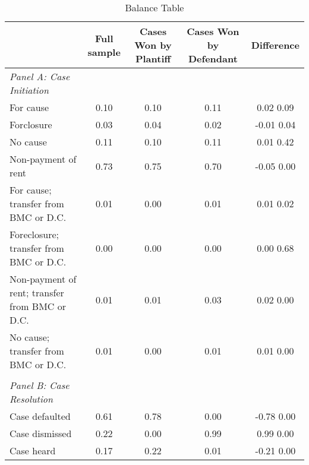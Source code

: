 \begin{table}[htbp]\centering
\def\sym#1{\ifmmode^{#1}\else\(^{#1}\)\fi}
\caption{Balance Table}
\begin{tabular}{l*{4}{c}}
\toprule
                    &\multicolumn{1}{c}{Full sample}&\multicolumn{1}{c}{Cases Won by Plantiff}&\multicolumn{1}{c}{Cases Won by Defendant}&\multicolumn{1}{c}{Difference}\\
\midrule
\emph{Panel A: Case Initiation}&            &            &            &            \\
\hspace{0.25cm}For cause&      0.10  &      0.10  &      0.11  &   0.02 0.09\\
\hspace{0.25cm}Forclosure&      0.03  &      0.04  &      0.02  &  -0.01 0.04\\
\hspace{0.25cm}No cause&      0.11  &      0.10  &      0.11  &   0.01 0.42\\
\hspace{0.25cm}Non-payment of rent&      0.73  &      0.75  &      0.70  &  -0.05 0.00\\
\hspace{0.25cm}For cause; transfer from BMC or D.C.&      0.01  &      0.00  &      0.01  &   0.01 0.02\\
\hspace{0.25cm}Foreclosure; transfer from BMC or D.C.&      0.00  &      0.00  &      0.00  &   0.00 0.68\\
\hspace{0.25cm}Non-payment of rent; transfer from BMC or D.C.&      0.01  &      0.01  &      0.03  &   0.02 0.00\\
\hspace{0.25cm}No cause; transfer from BMC or D.C.&      0.01  &      0.00  &      0.01  &   0.01 0.00\\
\vspace{0.1em} \\ \emph{Panel B: Case Resolution}&            &            &            &            \\
\hspace{0.25cm}Case defaulted&      0.61  &      0.78  &      0.00  &  -0.78 0.00\\
\hspace{0.25cm}Case dismissed&      0.22  &      0.00  &      0.99  &   0.99 0.00\\
\hspace{0.25cm}Case heard&      0.17  &      0.22  &      0.01  &  -0.21 0.00\\

\end{tabular}
\end{table}
